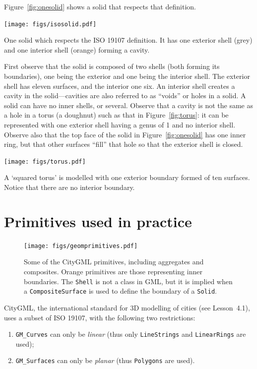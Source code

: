 %

Figure~\ref{fig:onesolid} shows a solid that respects that definition.
\begin{marginfigure}
  \centering
  \texttt{[image: figs/isosolid.pdf]}
  \caption{One solid which respects the ISO 19107 definition. It has one exterior shell (grey) and one interior shell (orange) forming a cavity.}%
\label{fig:onesolid}
\end{marginfigure}
First observe that the solid is composed of two shells (both forming its boundaries), one being the exterior and one being the interior shell.
The exterior shell has eleven surfaces, and the interior one six.
An interior shell creates a cavity in the solid---cavities are also referred to as ``voids'' or holes in a solid.
A solid can have no inner shells, or several.
Observe that a cavity is not the same as a hole in a torus (a doughnut) such as that in Figure~\ref{fig:torus}: it can be represented with one exterior shell having a genus of 1 and no interior shell.
Observe also that the top face of the solid in Figure~\ref{fig:onesolid} has one inner ring, but that other surfaces ``fill'' that hole so that the exterior shell is closed.
\begin{marginfigure}
  \centering
  \texttt{[image: figs/torus.pdf]}
  \caption{A `squared torus' is modelled with one exterior boundary formed of ten surfaces. Notice that there are no interior boundary.}%
\label{fig:torus}
\end{marginfigure}


%
\section{Primitives used in practice}

\begin{figure}
  \centering
  \texttt{[image: figs/geomprimitives.pdf]}
  \caption{Some of the CityGML primitives, including aggregates and composites. Orange primitives are those representing inner boundaries. The \texttt{Shell} is not a class in GML, but it is implied when a \texttt{CompositeSurface} is used to define the boundary of a \texttt{Solid}.}%
\label{fig:geomprimitives}
\end{figure}

%

CityGML, the international standard for 3D modelling of cities (see Lesson~4.1), uses a subset of ISO 19107, with the following two restrictions: 
\begin{enumerate}
  \item \texttt{GM\_Curves} can only be \emph{linear} (thus only \texttt{LineStrings} and \texttt{LinearRings} are used); 
  \item \texttt{GM\_Surfaces} can only be \emph{planar} (thus \texttt{Polygons} are used).
\end{enumerate}

